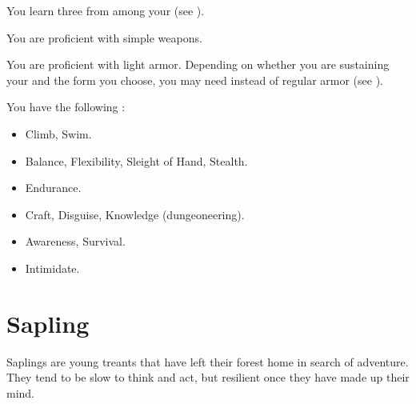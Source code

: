       You learn three  from among your  (see ).

      You are proficient with simple weapons.

      You are proficient with light armor.
      Depending on whether you are sustaining your  and the form you choose, you may need  instead of regular armor (see ).

      You have the following :
      \begin{itemize}
        \item {} Climb, Swim.
        \item {} Balance, Flexibility, Sleight of Hand, Stealth.
        \item {} Endurance.
        \item {} Craft, Disguise, Knowledge (dungeoneering).
        \item {} Awareness, Survival.
        \item {} Intimidate.
      \end{itemize}

\section{Sapling}

  Saplings are young treants that have left their forest home in search of adventure.
  They tend to be slow to think and act, but resilient once they have made up their mind.


